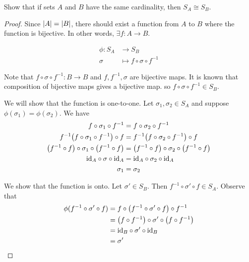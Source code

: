 \begin{exercise}
    Show that if sets $A$ and $B$ have the same cardinality, then $S_A \cong S_B$.
\end{exercise}

\begin{proof}
    Since $\qty|A| = \qty|B|$, there should exist a function from $A$ to $B$ where the function is bijective. In other words, $\exists f : A \to B$. 
    
    \begin{align*}
        \phi : S_A &\to S_B \\ 
        \sigma &\mapsto f \circ \sigma \circ f^{-1}
    \end{align*}
    
    Note that $f \circ \sigma \circ f^{-1} : B \to B$ and $f, f^{-1}, \sigma$ are bijective maps. It is known that composition of bijective maps gives a bijective map. so $f \circ \sigma \circ f^{-1} \in S_B$.
    
    We will show that the function is one-to-one. Let $\sigma_1, \sigma_2 \in S_A$ and suppose $\phi(\sigma_1) = \phi(\sigma_2)$. We have
    \begin{align*}
        f \circ \sigma_1 \circ f^{-1} &= f \circ \sigma_2 \circ f^{-1} \\
        f^{-1} \qty(f \circ \sigma_1 \circ f^{-1}) \circ f &= f^{-1} \qty(f \circ \sigma_2 \circ f^{-1}) \circ f \\
        \qty(f^{-1} \circ f) \circ \sigma_1 \circ \qty(f^{-1} \circ f) &= \qty(f^{-1} \circ f) \circ \sigma_2 \circ \qty(f^{-1} \circ f) \\
         \text{id}_A \circ \sigma \circ \text{id}_A &= \text{id}_A \circ \sigma_2 \circ \text{id}_A \\
         \sigma_1 &= \sigma_2 
    \end{align*}
    
    We show that the function is onto. Let $\sigma' \in S_B$. Then $f^{-1} \circ \sigma' \circ f \in S_A$. Observe that
    \begin{align*}
        \phi(f^{-1} \circ \sigma' \circ f) &= f \circ \qty(f^{-1} \circ \sigma' \circ f) \circ f^{-1} \\
        &= \qty(f \circ f^{-1}) \circ \sigma' \circ \qty(f \circ f^{-1})  \\
        &= \text{id}_B \circ \sigma' \circ \text{id}_B \\
        &= \sigma' 
    \end{align*}
    

\end{proof}
